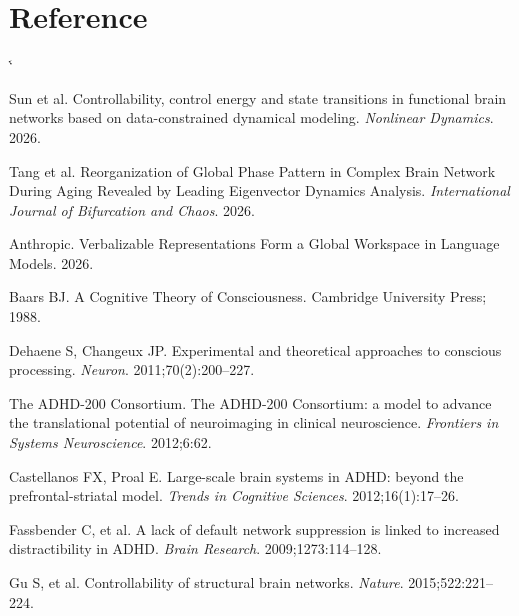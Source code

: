 \documentclass{article}
\begin{document}
\newpage
\section{Reference}
\makeatletter
\renewenvironment{thebibliography}[1]
     {\list{\@biblabel{\@arabic\c@enumiv}}%
          {\settowidth\labelwidth{\@biblabel{#1}}%
           \leftmargin\labelwidth
           \advance\leftmargin\labelsep
           \usecounter{enumiv}%
           \let\p@enumiv\@empty
           \renewcommand\theenumiv{\@arabic\c@enumiv}}%
     \sloppy
     \clubpenalty4000
     \sfcode`\.\@m}
     {\endlist}
\makeatother

\begin{thebibliography}{99}

Sun et al.
Controllability, control energy and state transitions in functional brain
networks based on data-constrained dynamical modeling.
\textit{Nonlinear Dynamics}. 2026.

Tang et al.
Reorganization of Global Phase Pattern in Complex Brain Network During Aging
Revealed by Leading Eigenvector Dynamics Analysis.
\textit{International Journal of Bifurcation and Chaos}. 2026.

Anthropic.
Verbalizable Representations Form a Global Workspace in Language Models.
2026.

Baars BJ.
A Cognitive Theory of Consciousness.
Cambridge University Press; 1988.

Dehaene S, Changeux JP.
Experimental and theoretical approaches to conscious processing.
\textit{Neuron}. 2011;70(2):200--227.

The ADHD-200 Consortium.
The ADHD-200 Consortium: a model to advance the translational potential of
neuroimaging in clinical neuroscience.
\textit{Frontiers in Systems Neuroscience}. 2012;6:62.

Castellanos FX, Proal E.
Large-scale brain systems in ADHD: beyond the prefrontal-striatal model.
\textit{Trends in Cognitive Sciences}. 2012;16(1):17--26.

Fassbender C, et al.
A lack of default network suppression is linked to increased distractibility
in ADHD.
\textit{Brain Research}. 2009;1273:114--128.

Gu S, et al.
Controllability of structural brain networks.
\textit{Nature}. 2015;522:221--224.


\end{thebibliography}
\end{document}
